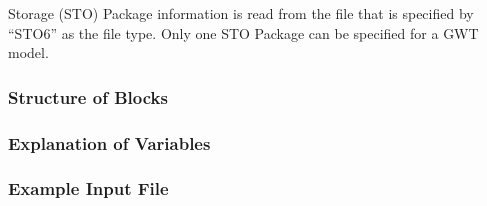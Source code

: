 Storage (STO) Package information is read from the file that is specified by ``STO6'' as the file type.  Only one STO Package can be specified for a GWT model. 

\vspace{5mm}
\subsubsection{Structure of Blocks}
%


\vspace{5mm}
\subsubsection{Explanation of Variables}
\begin{description}

\end{description}

\vspace{5mm}
\subsubsection{Example Input File}



